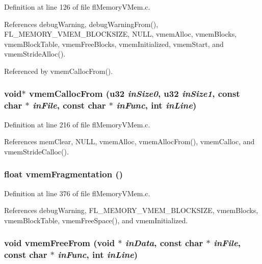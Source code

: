 Definition at line 126 of file fl\-Memory\-VMem.c.

References debug\-Warning, debug\-Warning\-From(), FL\_\-MEMORY\_\-VMEM\_\-BLOCKSIZE, NULL, vmem\-Alloc, vmem\-Blocks, vmem\-Block\-Table, vmem\-Free\-Blocks, vmem\-Initialized, vmem\-Start, and vmem\-Stride\-Alloc().

Referenced by vmem\-Calloc\-From().
\subsubsection{\setlength{\rightskip}{0pt plus 5cm}void$\ast$ vmem\-Calloc\-From (u32 {\em in\-Size0}, u32 {\em in\-Size1}, const char $\ast$ {\em in\-File}, const char $\ast$ {\em in\-Func}, int {\em in\-Line})}\label{flMemoryVMem_8c_4f45e2c3068d12fc1e2e04303fc5b1c3}




Definition at line 216 of file fl\-Memory\-VMem.c.

References mem\-Clear, NULL, vmem\-Alloc, vmem\-Alloc\-From(), vmem\-Calloc, and vmem\-Stride\-Calloc().
\subsubsection{\setlength{\rightskip}{0pt plus 5cm}float vmem\-Fragmentation ()}\label{flMemoryVMem_8c_d65d9069bd87a54399bbc16b629ec252}




Definition at line 376 of file fl\-Memory\-VMem.c.

References debug\-Warning, FL\_\-MEMORY\_\-VMEM\_\-BLOCKSIZE, vmem\-Blocks, vmem\-Block\-Table, vmem\-Free\-Space(), and vmem\-Initialized.
\subsubsection{\setlength{\rightskip}{0pt plus 5cm}void vmem\-Free\-From (void $\ast$ {\em in\-Data}, const char $\ast$ {\em in\-File}, const char $\ast$ {\em in\-Func}, int {\em in\-Line})}\label{flMemoryVMem_8c_26a131b91a9f5fa087737310af66299a}




